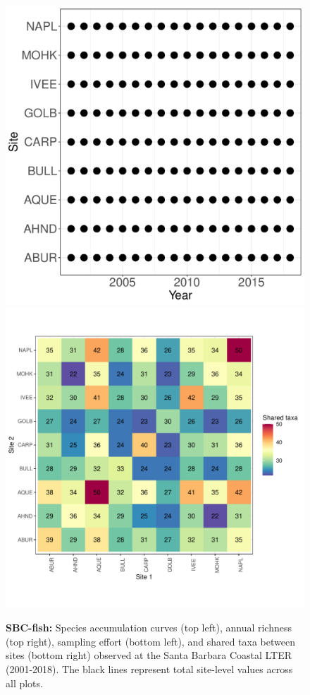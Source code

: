\documentclass[11pt, oneside]{article}
\begin{document}
\begin{figure}[h!]
\includegraphics[scale = 0.4]{sbc-fish-castorani_spatiotemporal_sampling_effort.pdf}
\includegraphics[scale = 0.4]{sbc-fish-castorani_spp_shared.pdf}
\caption{{\bf SBC-fish:} Species accumulation curves (top left),  annual richness (top right), sampling effort (bottom left), and shared taxa between sites (bottom right) observed at the Santa Barbara Coastal LTER (2001-2018). The black lines represent total site-level values across all plots.}
\label{sbc-fish}
\end{figure}
\end{document}
